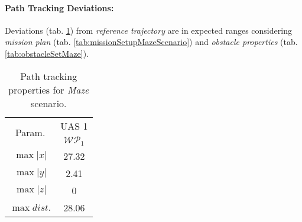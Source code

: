 \paragraph{Path Tracking Deviations:} Deviations (tab. \ref{tab:pathTrackingParametersForMazeAvoidance}) from \emph{reference trajectory} are in expected ranges considering \emph{mission plan} (tab. \ref{tab:missionSetupMazeScenario}) and \emph{obstacle properties} (tab. \ref{tab:obstacleSetMaze}).

\begin{table}[H]
    \centering
    \begin{tabular}{c||c}
        \multirow{2}{*}{Param.} & UAS 1\\\cline{2-2}
                        & $\mathscr{WP}_1$  \\\hline\hline
          $\max |x|$    & 27.32             \\\hline
          $\max |y|$    & 2.41             \\\hline
          $\max |z|$    & 0                 \\\hline
          $\max dist.$  & 28.06             \\
    \end{tabular}
    \caption{Path tracking properties for \emph{Maze} scenario.}
    \label{tab:pathTrackingParametersForMazeAvoidance}
\end{table}


